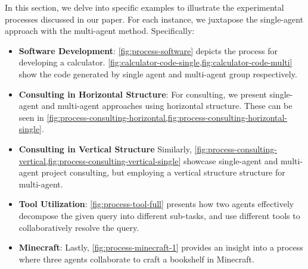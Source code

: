 In this section, we delve into specific examples to illustrate the experimental processes discussed in our paper. For each instance, we juxtapose the single-agent approach with the multi-agent method. Specifically:
\begin{itemize}
    \item \textbf{Software Development}: \cref{fig:process-software} depicts the process for developing a calculator. \cref{fig:calculator-code-single,fig:calculator-code-multi} show the code generated by single agent and multi-agent group respectively.
    \item \textbf{Consulting in Horizontal Structure}: For consulting, we present single-agent and multi-agent approaches using horizontal structure. These can be seen in \cref{fig:process-consulting-horizontal,fig:process-consulting-horizontal-single}.
    \item \textbf{Consulting in Vertical Structure} Similarly, \cref{fig:process-consulting-vertical,fig:process-consulting-vertical-single} showcase single-agent and multi-agent project consulting, but employing a vertical structure structure for multi-agent.
    \item \textbf{Tool Utilization}: \cref{fig:process-tool-full} presents how two agents effectively decompose the given query into different sub-tasks, and use different tools to collaboratively resolve the query.
    \item \textbf{Minecraft}: Lastly, \cref{fig:process-minecraft-1} provides an insight into a process where three agents collaborate to craft a bookshelf in Minecraft.
\end{itemize}
















